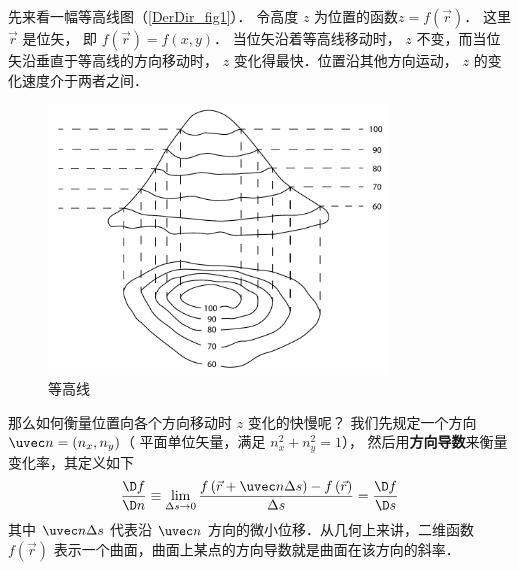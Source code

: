 

先来看一幅等高线图（\autoref{DerDir_fig1}）． 令高度 $z$ 为位置的函数$z = f(\vec r)$． 这里 $\vec r$ 是位矢， 即 $f(\vec r) = f(x,y)$． 当位矢沿着等高线移动时， $z$ 不变，而当位矢沿垂直于等高线的方向移动时， $z$ 变化得最快．位置沿其他方向运动， $z$ 的变化速度介于两者之间．

\begin{figure}[ht]
\centering
\includegraphics[width=9cm]{./figures/DerDir.pdf}
\caption{等高线}\label{DerDir_fig1}
\end{figure}

那么如何衡量位置向各个方向移动时 $z$ 变化的快慢呢？ 我们先规定一个方向 $\uvec n = (n_x,n_y)$（ 平面单位矢量，满足 $n_x^2 + n_y^2 = 1$）， 然后用\textbf{方向导数}来衡量变化率，其定义如下
 \begin{equation}
\frac{{\D f}}{{\D n}} \equiv \mathop {\lim }\limits_{\Delta s \to 0} \frac{{f\left( {\vec r + \uvec n\Delta s} \right) - f\left( {\vec r} \right)}}{{\Delta s}} = \frac{{\D f}}{{\D s}}
\end{equation}
其中 $\uvec n\Delta s$ 代表沿 $\uvec n$ 方向的微小位移．从几何上来讲，二维函数 $f(\vec r)$ 表示一个曲面，曲面上某点的方向导数就是曲面在该方向的斜率．


